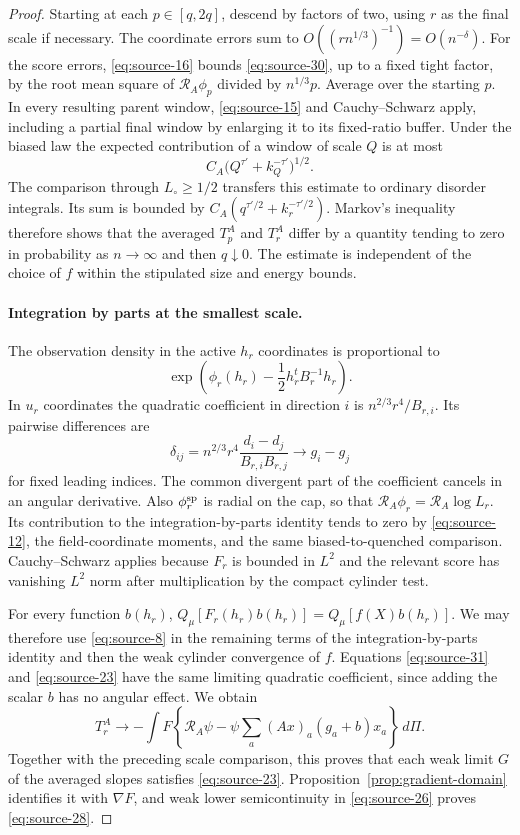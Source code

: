 \begin{proof}
Starting at each $p\in[q,2q]$, descend by factors of two, using $r$
as the final scale if necessary. The coordinate errors sum to
$O((rn^{1/3})^{-1})=O(n^{-\delta})$. For the score errors,
\eqref{eq:source-16} bounds \eqref{eq:source-30}, up to a fixed tight
factor, by the root mean square of $\mathcal R_A\phi_p$ divided by
$n^{1/3}p$. Average over the starting $p$. In every resulting parent
window, \eqref{eq:source-15} and Cauchy--Schwarz apply, including a
partial final window by enlarging it to its fixed-ratio buffer. Under
the biased law the expected contribution of a window of scale $Q$ is
at most
\[
 C_A\bigl(Q^{\tau'}+k_Q^{-\tau'}\bigr)^{1/2}.
\]
The comparison through $L_\circ\ge1/2$ transfers this estimate to
ordinary disorder integrals. Its sum is bounded by
$C_A(q^{\tau'/2}+k_r^{-\tau'/2})$. Markov's inequality therefore shows
that the averaged $T_p^A$ and $T_r^A$ differ by a quantity tending to
zero in probability as $n\to\infty$ and then $q\downarrow0$. The
estimate is independent of the choice of $f$ within the stipulated
size and energy bounds.

\paragraph{Integration by parts at the smallest scale.}
The observation density in the active $h_r$ coordinates is proportional
to
\[
 \exp\left(\phi_r(h_r)-\frac12h_r^tB_r^{-1}h_r\right).
\]
In $u_r$ coordinates the quadratic coefficient in direction $i$ is
$n^{2/3}r^4/B_{r,i}$. Its pairwise differences are
\begin{equation}
 \delta_{ij}
 =n^{2/3}r^4\frac{d_i-d_j}{B_{r,i}B_{r,j}}
 \longrightarrow g_i-g_j
 \label{eq:source-31}
\end{equation}
for fixed leading indices. The common divergent part of the coefficient
cancels in an angular derivative. Also $\phi_r^{\rm sp}$ is radial on
the cap, so that
$\mathcal R_A\phi_r=\mathcal R_A\log L_r$. Its contribution to the
integration-by-parts identity tends to zero by
\eqref{eq:source-12}, the field-coordinate moments, and the same
biased-to-quenched comparison. Cauchy--Schwarz applies because $F_r$
is bounded in $L^2$ and the relevant score has vanishing $L^2$ norm
after multiplication by the compact cylinder test.

For every function $b(h_r)$,
$Q_\mu[F_r(h_r)b(h_r)]=Q_\mu[f(X)b(h_r)]$. We may therefore use
\eqref{eq:source-8} in the remaining terms of the integration-by-parts
identity and then the weak cylinder convergence of $f$. Equations
\eqref{eq:source-31} and \eqref{eq:source-23} have the same limiting
quadratic coefficient, since adding the scalar $b$ has no angular
effect. We obtain
\[
 T_r^A\longrightarrow
 -\int F\left\{\mathcal R_A\psi
       -\psi\sum_a(Ax)_a(g_a+b)x_a\right\}\,d\Pi.
\]
Together with the preceding scale comparison, this proves that each
weak limit $G$ of the averaged slopes satisfies
\eqref{eq:source-23}. Proposition~\ref{prop:gradient-domain} identifies
it with $\nabla F$, and weak lower semicontinuity in
\eqref{eq:source-26} proves \eqref{eq:source-28}.


\end{proof}
